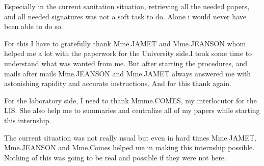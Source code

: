 Especially in the current sanitation situation, retrieving all the needed papers, and all needed signatures was not a soft task to do. Alone i would never have been able to do so.\newline

For this I have to gratefully thank Mme.JAMET and Mme.JEANSON whom helped me a lot with the paperwork for the University side.I took some time to understand what was wanted from me. But after starting the procedures, and mails after mails Mme.JEANSON and Mme.JAMET always answered me with astonishing rapidity and accurate instructions. And for this thank again.

For the laboratory side, I need to thank Mmme.COMES, my interlocutor for the LIS. She also help me to summaries and centralize all of my papers while starting this internship.

The current situation was not really usual but even in hard times Mme.JAMET, Mme.JEANSON and Mme.Comes helped me in making this internship possible. Nothing of this was going to be real and possible if they were not here.